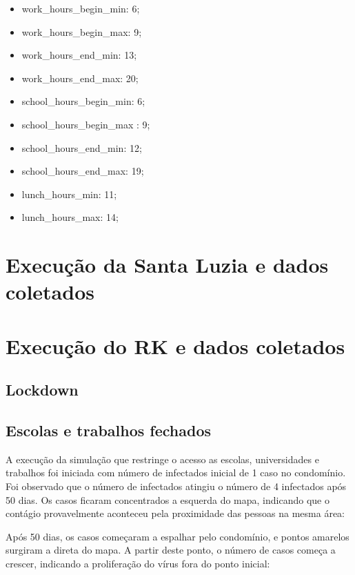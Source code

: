 \begin{itemize}
\item work\_hours\_begin\_min: 6;
\item work\_hours\_begin\_max: 9;
\item work\_hours\_end\_min: 13; 
\item work\_hours\_end\_max: 20;
\item school\_hours\_begin\_min: 6;
\item school\_hours\_begin\_max : 9;
\item school\_hours\_end\_min: 12;
\item school\_hours\_end\_max: 19;
\item lunch\_hours\_min: 11;
\item lunch\_hours\_max: 14;
\end{itemize}





\section{Execução da Santa Luzia e dados coletados}

\section{Execução do RK e dados coletados}

\subsection{Lockdown}

\subsection{Escolas e trabalhos fechados}

A execução da simulação que restringe o acesso as escolas, universidades e trabalhos foi iniciada com número de infectados inicial de 1 caso no condomínio. Foi observado que o número de infectados atingiu o número de 4 infectados após 50 dias. Os casos ficaram concentrados a esquerda do mapa, indicando que o contágio provavelmente aconteceu pela proximidade das pessoas na mesma área:


Após 50 dias, os casos começaram a espalhar pelo condomínio, e pontos amarelos surgiram a direta do mapa. A partir deste ponto, o número de casos começa a crescer, indicando a proliferação do vírus fora do ponto inicial:

